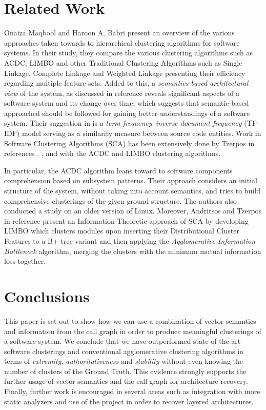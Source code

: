\documentclass[sigconf,review, anonymous]{acmart}
\begin{document}
\section{Related Work}

Onaiza Maqbool and Haroon A. Babri \cite{maqbool_overview} present an
overview of the various approaches taken towards to hierarchical clustering algorithms
for software systems. In their study, they compare the various clustering algorithms
such as ACDC, LIMBO and other Traditional Clustering Algorithms such as Single
Linkage, Complete Linkage and Weighted Linkage presenting their efficiency regarding 
multiple feature sets. 
Added to this, a \emph{semantics-based architectural view} of the system, as discussed in reference
\cite{large_study} reveals significant aspects of a software system and its change over 
time, which suggests that semantic-based approached should be followed for gaining better 
understandings of a software system. Their suggestion in \cite{large_study} is a \emph{term frequency--inverse 
document frequency} (TF-IDF) model serving as a similarity measure between source code 
entities. 
Work in Software Clustering Algorithms (SCA) has been extensively done by Tzerpos in
references \cite{mojo}, \cite{stability}, \cite{acdc} and \cite{limbo} with the ACDC
and LIMBO clustering algorithms. 

In particular, the ACDC algorithm leans toward to software components comprehension 
based on subsystem patterns. Their approach considers an initial structure of the system, 
without taking into account semantics, and tries to build comprehensive clusterings of the given ground structure. 
The authors also conducted a study on an older version of  Linux. 
Moreover, Andritsos and Tzerpos in reference \cite{limbo} present an Information-Theoretic 
approach of SCA by developing LIMBO which clusters modules upon inserting their Distributional Cluster Features 
to a B+-tree variant and then applying the \emph{Agglomerative Information Bottleneck} algorithm, merging the 
clusters with the minimum mutual information loss together. 


\section{Conclusions} 

This paper is set out to show how we can use a combination of vector semantics
and information from the call graph in order to produce meaningful clusterings of a software system.
We conclude that we have outperformed state-of-the-art software clusterings and conventional
agglomerative clustering algorithms 
in terms of \emph{extremity}, \emph{authoritativeness} and \emph{stability} 
without even knowing the number of clusters of the Ground Truth. This evidence strongly
supports the further usage of vector semantics and the call graph for architecture recovery.
Finally, further work is encouraged in several areas such as 
integration with more static analyzers and use of the project in order to recover layered architectures.


\newpage


\end{document}
